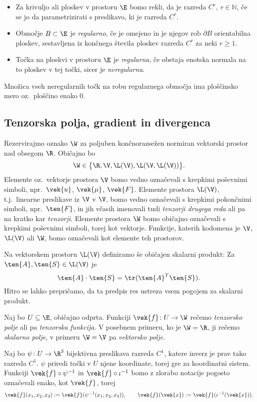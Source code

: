 \begin{definicija}
	\begin{itemize}
		\item
		Za krivuljo ali ploskev v prostoru $\E$ bomo rekli, da je razreda $C^r$, $r\in\mathbb{N}$, če se jo da
		parametrizirati s preslikavo, ki je razreda $C^r$.
		\item
		Območje $B\subset\E$ je \emph{regularno}, če je omejeno in je njegov rob $\partial B$
		orientabilna ploskev, sestavljena iz končnega števila ploskev razreda $C^r$ za neki $r\geq 1$.
		\item
		Točka na ploskvi v prostoru $\E$ je \emph{regularna}, če obstaja enotska normala
		na to ploskev v tej točki, sicer je \emph{neregularna}.
	\end{itemize}
\end{definicija}
Množica vseh neregularnih točk na robu regularnega območja ima ploščin\-sko mero oz.~ploščino enako 0.


\subsection{Tenzorska polja, gradient in divergenca}


Rezervirajmo oznako $\W$ za poljuben končnorazsežen normiran vektorski
prostor nad obsegom $\R$. Običajno bo
\[ \W\in\big\{ \R,\V,\L(\V),\L(\V,\L(\V)) \big\}. \]
Elemente oz.~vektorje prostora $\V$ bomo vedno označevali s krepkimi poševni\-mi simboli,
npr.~$\vek{u}$, $\vek{\mu}$, $\vek{F}$. Elemente prostora $\L(\V)$, t.j.~linearne
preslikave iz $\V$ v $\V$, bomo vedno označevali s krepkimi pokončnimi simboli, npr.~$\ten{F}$,
in jih včasih imenovali tudi \emph{tenzorji drugega reda} ali pa na kratko kar \emph{tenzorji}.
Elemente prostora $\W$ bomo običajno označevali s krepkimi poševnimi simboli, torej kot vektorje.
Funkcije, katerih kodomena je $\V$, $\L(\V)$ ali $\W$, bomo označevali kot elemente teh prostorov.

Na vektorskem prostoru $\L(\V)$ definiramo še običajen skalarni produkt: Za $\ten{A},\ten{S}\in\L(\V)$ je
\[ \ten{A}\cdot\ten{S}=\tr(\ten{A}^{T}\ten{S}). \]
Hitro se lahko prepričamo, da ta predpis res ustreza vsem pogojem za skalarni produkt.

Naj bo $U\subseteq\E$, običajno odprta. Funkciji $\vek{f}\colon U\to\W$ rečemo \emph{tenzorsko polje} ali pa
\emph{tenzorska funkcija}. V posebnem primeru, ko je $\W=\R$, ji rečemo \emph{skalarno polje},
v primeru $\W=\V$ pa \emph{vektorsko polje}.

Naj bo $\psi\colon U\to\R^3$ bijektivna preslikava razreda $C^1$, katere inverz je prav tako
razreda $C^1$. $\psi$ priredi točki v $U$ njene koordinate, torej gre za koordinatni sistem.
Funkciji $\vek{f}\circ\psi^{-1}$ in $\vek{f}\circ\iota^{-1}$ bomo z zlorabo notacije pogosto
označevali enako, kot $\vek{f}$, torej
\[
	\vek{f}(x_1,x_2,x_3):=\vek{f}(\psi^{-1}(x_1,x_2,x_3)),\qquad
	\vek{f}(\vek{x}):=\vek{f}(\iota^{-1}(\vek{x})).
\]

